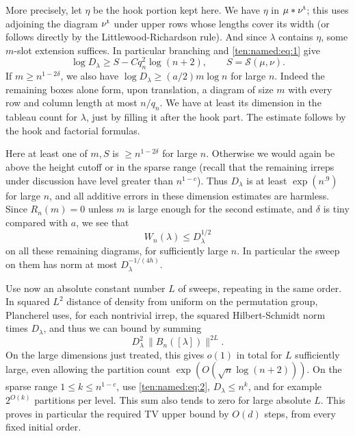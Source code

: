 More precisely, let \(\eta\) be the hook portion kept here. We have \(\eta\) in \(\mu*\nu^{\rm t}\); this uses adjoining the diagram \(\nu^{\rm t}\) under upper rows whose lengths cover its width (or follows directly by the Littlewood-Richardson rule). And since \(\lambda\) contains \(\eta\), some \(m\)-slot extension suffices. In particular branching and \eqref{ten:named:eq:1} give
\[
 \log D_\lambda\ge S-C q_n^2\log(n+2),
 \qquad S=\mathcal S(\mu,\nu).
\]
If \(m\ge n^{1-2\delta}\), we also have
\(\log D_\lambda\ge (a/2)m\log n\)
for large \(n\). Indeed the remaining boxes alone form, upon translation, a diagram of size \(m\) with every row and column length at most \(n/q_n\). We have at least its dimension in the tableau count for \(\lambda\), just by filling it after the hook part. The estimate follows by the hook and factorial formulas.

Here at least one of \(m,S\) is \(\ge n^{1-2\delta}\) for large \(n\). Otherwise we would again be above the height cutoff or in the sparse range (recall that the remaining irreps under discussion have level greater than \(n^{1-c}\)). Thus \(D_\lambda\) is at least \(\exp(n^{.9})\) for large \(n\), and all additive errors in these dimension estimates are harmless. Since \(R_n(m)=0\) unless \(m\) is large enough for the second estimate, and \(\delta\) is tiny compared with \(a\), we see that
\[
 W_n(\lambda)\le D_\lambda^{1/2}
\]
on all these remaining diagrams, for sufficiently large \(n\). In particular the sweep on them has norm at most \(D_\lambda^{-1/(4h)}\).

Use now an absolute constant number \(L\) of sweeps, repeating in the same order. In squared \(L^2\) distance of density from uniform on the permutation group, Plancherel uses, for each nontrivial irrep, the squared Hilbert-Schmidt norm times \(D_\lambda\), and thus we can bound by summing
\[
 D_\lambda^2\,\|B_n([\lambda])\|^{2L}.
\]
On the large dimensions just treated, this gives \(o(1)\) in total for \(L\) sufficiently large, even allowing the partition count \(\exp(O(\sqrt n\log(n+2)))\). On the sparse range \(1\le k\le n^{1-c}\), use \eqref{ten:named:eq:2}, \(D_\lambda\le n^k\), and for example \(2^{O(k)}\) partitions per level. This sum also tends to zero for large absolute \(L\). This proves in particular the required TV upper bound by \(O(d)\) steps, from every fixed initial order.
